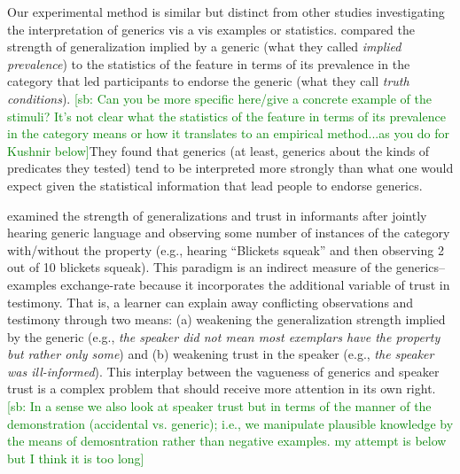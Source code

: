 \documentclass[10pt,letterpaper]{article}
\newcommand{\soph}[1]{\textcolor{Green}{[sb: #1]}}
\newcommand{\mht}[1]{\textcolor{Blue}{[mht: #1]}}
\begin{document}




Our experimental method is similar but distinct from other studies investigating the interpretation of generics vis a vis examples or statistics.
 compared the strength of generalization implied by a generic (what they called \emph{implied prevalence}) to the statistics of the feature in terms of its prevalence in the category that led participants to endorse the generic (what they call \emph{truth conditions}). \soph{Can you be more specific here/give a concrete example of the stimuli? It's not clear what the statistics of the feature in terms of its prevalence in the category means or how it translates to an empirical method...as you do for Kushnir below}They found that generics (at least, generics about the kinds of predicates they tested) tend to be interpreted more strongly than what one would expect given the statistical information that lead people to endorse generics. 

 examined the strength of generalizations and trust in informants after jointly hearing generic language and observing some number of instances of the category with/without the property (e.g., hearing ``Blickets squeak'' and then observing 2 out of 10 blickets squeak).
This paradigm is an indirect measure of the generics--examples exchange-rate because it incorporates the additional variable of trust in testimony.
That is, a learner can explain away conflicting observations and testimony through two means: (a) weakening the generalization strength implied by the generic (e.g., \emph{the speaker did not mean most exemplars have the property but rather only some}) and (b) weakening trust in the speaker (e.g., \emph{the speaker was ill-informed}). 
This interplay between the vagueness of generics and speaker trust is a complex problem that should receive more attention in its own right. \soph{In a sense we also look at speaker trust but in terms of the manner of the demonstration (accidental vs. generic); i.e., we manipulate plausible knowledge by the means of demosntration rather than negative examples. my attempt is below but I think it is too long}
\end{document}
